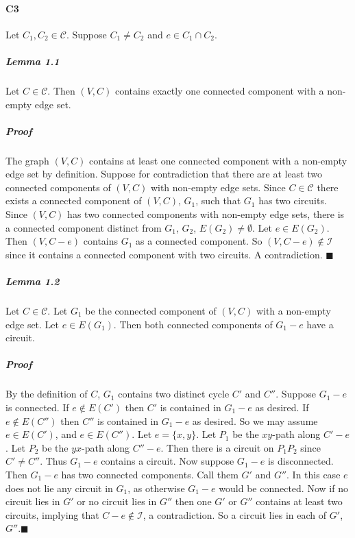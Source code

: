 \documentclass[letterpaper,12pt,oneside,onecolumn]{report}
\begin{document}
\paragraph{C3}
Let $C_1, C_2 \in \mathcal{C}$. Suppose $C_1 \neq C_2$ and $e \in C_1 \cap C_2$.
\subparagraph{Lemma 1.1}
Let $C \in \mathcal{C}$. Then $(V,C)$ contains exactly one connected component with a non-empty edge set.
\subparagraph{Proof}
The graph $(V,C)$ contains at least one connected component with a non-empty edge set by definition. Suppose for contradiction that there are at least two connected components of $(V,C)$ with non-empty edge sets.  Since $C \in \mathcal{C}$ there exists a connected component of $(V,C)$, $G_1$, such that $G_1$ has two circuits. Since $(V,C)$ has two connected components with non-empty edge sets, there is a connected component distinct from $G_1$, $G_2$, $E(G_2) \neq \emptyset$. Let $e \in E(G_2)$. Then $(V, C-e)$ contains $G_1$ as a connected component. So $(V, C-e) \not\in \mathcal{I}$ since it contains a connected component with two circuits. A contradiction. $\blacksquare$
\subparagraph{Lemma 1.2}
Let $C \in \mathcal{C}$. Let $G_1$ be the connected component of $(V,C)$ with a non-empty edge set. Let $e \in E(G_1)$. Then both connected components of $G_1 - e$ have a circuit.
\subparagraph{Proof}
By the definition of $C$, $G_1$ contains two distinct cycle $C'$ and $C''$. Suppose $G_1 - e$ is connected. If $e \not\in E(C')$ then $C'$ is contained in $G_1 - e$ as desired. If $e \not\in E(C'')$ then $C''$ is contained in $G_1 - e$ as desired. So we may assume $e \in E(C')$, and $e \in E(C'')$. Let $e = \{x,y\}$. Let $P_1$ be  the $xy$-path along $C'-e$. Let $P_2$ be the $yx$-path along $C''-e$. Then there is a circuit on $P_1P_2$ since $C' \neq C''$. Thus $G_1 - e$ contains a circuit. Now suppose $G_1 - e$ is disconnected. Then $G_1 - e$ has two connected components. Call them $G'$ and $G''$. In this case $e$ does not lie any circuit in $G_1$, as otherwise $G_1 - e$ would be connected. Now if no circuit lies in $G'$ or no circuit lies in $G''$ then one $G'$ or $G''$ contains at least two circuits, implying that $C - e \not \in \mathcal{I}$, a contradiction. So a circuit lies in each of $G'$, $G''$.$\blacksquare$
\end{document}

